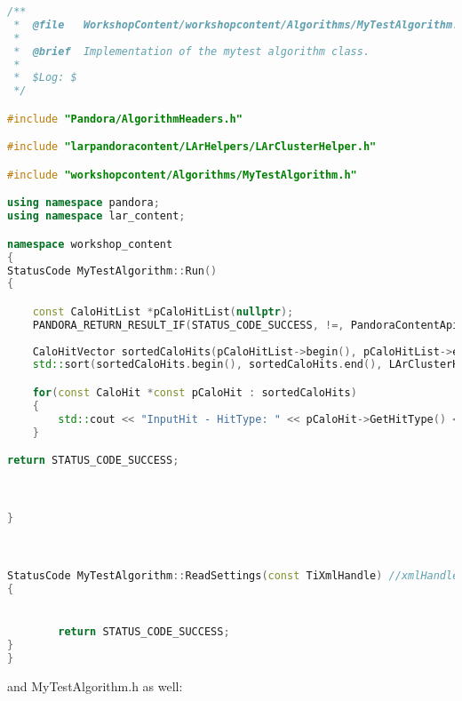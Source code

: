 \begin{lstlisting}[language=C++, caption=Version of MyTestAlgorithms.cc to sort hits regarding z-coordinate]
/**
 *  @file   WorkshopContent/workshopcontent/Algorithms/MyTestAlgorithm.cc
 * 
 *  @brief  Implementation of the mytest algorithm class.
 * 
 *  $Log: $
 */

#include "Pandora/AlgorithmHeaders.h"

#include "larpandoracontent/LArHelpers/LArClusterHelper.h"

#include "workshopcontent/Algorithms/MyTestAlgorithm.h"

using namespace pandora;
using namespace lar_content;

namespace workshop_content
{
StatusCode MyTestAlgorithm::Run()
{

	const CaloHitList *pCaloHitList(nullptr);
	PANDORA_RETURN_RESULT_IF(STATUS_CODE_SUCCESS, !=, PandoraContentApi::GetCurrentList(*this, pCaloHitList));
	
	CaloHitVector sortedCaloHits(pCaloHitList->begin(), pCaloHitList->end());
	std::sort(sortedCaloHits.begin(), sortedCaloHits.end(), LArClusterHelper::SortHitsByPosition);

	for(const CaloHit *const pCaloHit : sortedCaloHits)
	{
		std::cout << "InputHit - HitType: " << pCaloHit->GetHitType() << ", " << pCaloHit->GetPositionVector() << std::endl;
	}

return STATUS_CODE_SUCCESS;



}



StatusCode MyTestAlgorithm::ReadSettings(const TiXmlHandle) //xmlHandle)
{


        return STATUS_CODE_SUCCESS;
}
}
\end{lstlisting}

and MyTestAlgorithm.h as well:

